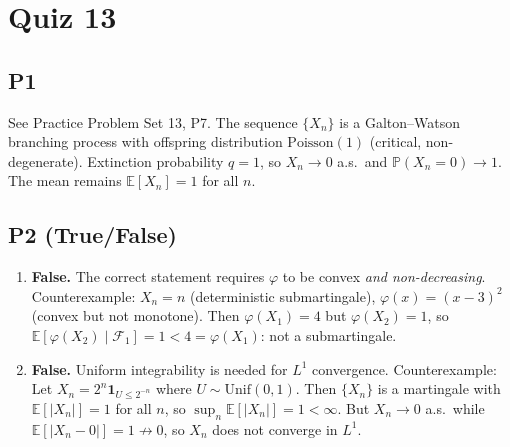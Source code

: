\documentclass[11pt]{article}
\newcommand{\PP}{\mathbb{P}}
\newcommand{\EE}{\mathbb{E}}
\newcommand{\1}{\mathbf{1}}
\begin{document}
\section{Quiz 13}

\subsection*{P1}
See Practice Problem Set 13, P7.  The sequence $\{X_n\}$ is a Galton--Watson branching process with offspring distribution $\mathrm{Poisson}(1)$ (critical, non-degenerate).  Extinction probability $q=1$, so $X_n\to0$ a.s.\ and $\PP(X_n=0)\to1$.  The mean remains $\EE[X_n]=1$ for all $n$.

\subsection*{P2 (True/False)}
\begin{enumerate}
\item \textbf{False.} The correct statement requires $\varphi$ to be convex \emph{and non-decreasing}.  Counterexample: $X_n=n$ (deterministic submartingale), $\varphi(x)=(x-3)^2$ (convex but not monotone).  Then $\varphi(X_1)=4$ but $\varphi(X_2)=1$, so $\EE[\varphi(X_2)\mid\mathcal F_1]=1<4=\varphi(X_1)$: not a submartingale.
\item \textbf{False.} Uniform integrability is needed for $L^1$ convergence.  Counterexample: Let $X_n=2^n\1_{U\le2^{-n}}$ where $U\sim\mathrm{Unif}(0,1)$.  Then $\{X_n\}$ is a martingale with $\EE[|X_n|]=1$ for all $n$, so $\sup_n\EE[|X_n|]=1<\infty$.  But $X_n\to0$ a.s.\ while $\EE[|X_n-0|]=1\not\to0$, so $X_n$ does not converge in $L^1$.
\end{enumerate}
\end{document}
